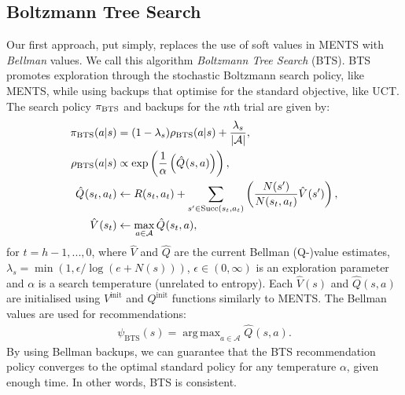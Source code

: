 \documentclass{article}
\newcommand{\cl}[1]{\mathcal{#1}}
\newcommand{\Vt}[2]{\hat{V}^{#2}(#1)}
\newcommand{\Qt}[3]{\hat{Q}^{#3}(#1,#2)}
\newcommand{\succc}[2]{\textnormal{Succ}(#1,#2)}
\DeclareMathOperator*{\argmax}{arg\,max}
\theoremstyle{plain}
\begin{document}
    
    \subsection{Boltzmann Tree Search} \label{sec:bts}
        Our first approach, put simply, replaces the use of soft values in MENTS with 
        \textit{Bellman} 
        values. We call this algorithm \textit{Boltzmann Tree Search} (BTS). BTS promotes exploration through the stochastic Boltzmann search policy, like MENTS, while using backups that optimise for the standard objective, like UCT. The search policy $\pi_{\textnormal{BTS}}$ and backups for the $n$th trial are given by:
        \begin{align}
            \pi_{\textnormal{BTS}}(a|s) &= (1-\lambda_s)\rho_{\textnormal{BTS}}(a|s) + \frac{\lambda_s}{|\cl{A}|}, \label{eq:bts_search_policy} \\ 
            \rho_{\textnormal{BTS}}(a|s) &\propto \exp\left(\frac{1}{\alpha}\left(\Qt{s}{a}{}\right)\right), \label{eq:bts_value_policy} \\ %
            \Qt{s_t}{a_t}{} &\leftarrow R(s_t,a_t) + \sum_{s' \in \succc{s_t}{a_t}} \left( \frac{N(s')}{N(s_t,a_t)} \Vt{s'}{} \right), \label{eq:dp_q_backup} \\ 
            \Vt{s_t}{} &\leftarrow\max_{a\in\cl{A}} \Qt{s_t}{a}{}, \label{eq:dp_v_backup} 
        \end{align}
        for $t=h-1,...,0$, where $\hat{V}$ and $\hat{Q}$ are 
        the current Bellman (Q-)value estimates,  
        $\lambda_s=\min(1,\epsilon/\log(e+N(s)))$, $\epsilon \in (0,\infty)$ is an exploration parameter and $\alpha$ is a search temperature (unrelated to entropy). 
        Each $\hat{V}(s)$ and $\hat{Q}(s,a)$ are initialised using $V^{\text{init}}$ and $Q^{\text{init}}$ functions similarly to MENTS. The 
        Bellman
        values are used for recommendations:
        \begin{align}
            \psi_{\text{BTS}}(s)=\argmax_{a\in\cl{A}}\Qt{s}{a}{}.
        \end{align}
        By using 
        Bellman
        backups, we can guarantee that the BTS recommendation policy converges to the optimal standard policy for any temperature $\alpha$, given enough time. In other words, BTS is consistent.
\end{document}
